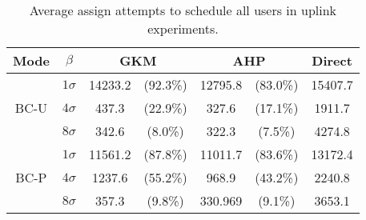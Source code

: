 \begin{table}[htb]
	\centering    
	\caption{Average assign attempts to schedule all users in uplink experiments.}
	\label{tab:assign_attempts_bc_v}
	\begin{tabular}{c|c|cc|cc|c}
		Mode & $\beta$ & \multicolumn{2}{c|}{GKM} & \multicolumn{2}{c|}{AHP} & Direct \\\hline
		\multirow{3}{*}{BC-U}
		& $1\sigma$ & 14233.2 & (92.3\%) & 12795.8 & (83.0\%) & 15407.7 \\ \cline{2-7}
		& $4\sigma$ & 437.3 & (22.9\%) & 327.6 & (17.1\%) &  1911.7  \\ \cline{2-7}
		& $8\sigma$ & 342.6 & (8.0\%) & 322.3 & (7.5\%) &   4274.8   \\ \hline
		\multirow{3}{*}{BC-P}
		& $1\sigma$ & 11561.2 & (87.8\%) & 11011.7 & (83.6\%) & 13172.4   \\ \cline{2-7}
		& $4\sigma$ & 1237.6 & (55.2\%)  & 968.9 & (43.2\%) & 2240.8  \\ \cline{2-7}
		& $8\sigma$ & 357.3 & (9.8\%) & 330.969 & (9.1\%)  & 3653.1   \\ \hline
	\end{tabular}
\end{table}

